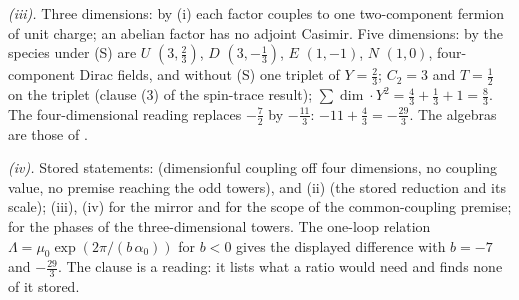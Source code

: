 \emph{(iii).} Three dimensions: by (i) each factor couples to one two-component fermion of unit charge; an abelian factor has no adjoint Casimir. Five dimensions: by  the species under (S) are $U$ $(3, \tfrac23)$, $D$ $(3, -\tfrac13)$, $E$ $(1, -1)$, $N$ $(1, 0)$, four-component Dirac fields, and without (S) one triplet of $Y = \tfrac23$; $C_{2} = 3$ and $T = \tfrac12$ on the triplet (clause (3) of the spin-trace result); $\sum\dim\cdot Y^{2} = \tfrac43 + \tfrac13 + 1 = \tfrac83$. The four-dimensional reading replaces $-\tfrac72$ by $-\tfrac{11}{3}$: $-11 + \tfrac43 = -\tfrac{29}{3}$. The algebras are those of .

\emph{(iv).} Stored statements:  (dimensionful coupling off four dimensions, no coupling value, no premise reaching the odd towers),  and (ii) (the stored reduction and its scale); (iii), (iv) for the mirror and for the scope of the common-coupling premise;  for the phases of the three-dimensional towers. The one-loop relation $\Lambda = \mu_{0}\exp(2\pi/(b\,\alpha_{0}))$ for $b < 0$ gives the displayed difference with $b = -7$ and $-\tfrac{29}{3}$. The clause is a reading: it lists what a ratio would need and finds none of it stored.
